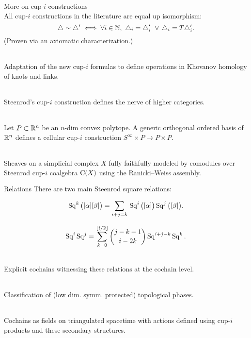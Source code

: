 \begin{frame}{More on cup-$i$ constructions}
	\pause
	 \\
	All cup-$i$ constructions in the literature are equal up isomorphism:
	\vskip -7.5pt
	\[
	\triangle \sim \triangle^\prime \iff \forall i \in \mathbb{N}, \ \triangle_i = \triangle_i^\prime \ \vee \, \triangle_i = T \triangle_i^\prime.
	\]
	\vskip -3pt
	(Proven via an axiomatic characterization.)

	\medskip\pause
	 \\
	Adaptation of the new cup-$i$ formulas to define operations in Khovanov homology of knots and links.

	\medskip\pause
	 \\
	Steenrod's cup-$i$ construction defines the nerve of higher categories.

	\medskip\pause
	 \\
	Let $P \subset \mathbb{R}^n$ be an $n$-dim convex polytope.
	A generic orthogonal ordered basis of $\mathbb{R}^n$ defines a cellular cup-$i$ construction $S^\infty \times P \to P \times P$.

	\medskip\pause
	 \\
	Sheaves on a simplicial complex $X$ fully faithfully modeled by comodules over Steenrod cup-$i$ coalgebra $\operatorname{C}(X)$ using the Ranicki--Weiss assembly.
\end{frame}

\begin{frame}{Relations}
	\pause
	There are two main Steenrod square relations:

	\bigskip\pause
	\vspace*{-5pt}
	\begin{equation*}
		\operatorname{Sq}^k \big( [\alpha] [\beta] \big) =
		\sum_{i+j=k} \, \operatorname{Sq}^i\big([\alpha]\big) \operatorname{Sq}^j\big([\beta]\big).
	\end{equation*}

	\pause
	\vspace*{-5pt}
	\begin{equation*}
		\operatorname{Sq}^i \operatorname{Sq}^j =
		\sum_{k=0}^{\lfloor i/2 \rfloor} \binom{j-k-1}{i-2k} \operatorname{Sq}^{i+j-k} \operatorname{Sq}^k.
	\end{equation*}

	\medskip\pause
	 \\
	Explicit cochains witnessing these relations at the cochain level.

	\medskip\pause
	 \\
	Classification of (low dim. symm. protected) topological phases.

	\medskip\pause
	 \\
	Cochains as fields on triangulated spacetime with actions defined using cup-$i$ products and these secondary structures.
\end{frame}
